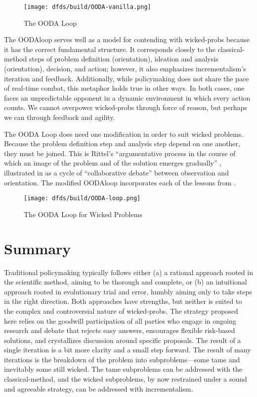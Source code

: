 \begin{figure}[h]
    \centering\CaptionFontSize
    \texttt{[image: dfds/build/OODA-vanilla.png]}
    \caption{The OODA Loop}
    \label{fig-ooda-loop}
\end{figure}

The \ac{OODAloop} serves well as a model for contending with \acp{wicked-prob} because it has the correct fundamental
structure. It corresponds closely to the \ac{classical-method} steps of problem definition (orientation), ideation and
analysis (orientation), decision, and action; however, it also emphasizes \ac{incrementalism}'s iteration and feedback.
Additionally, while policymaking does not share the pace of real-time combat, this metaphor holds true in other ways. In
both cases, one faces an unpredictable opponent in a dynamic environment in which every action counts. We cannot
overpower \acp{wicked-prob} through force of reason, but perhaps we can through feedback and agility.

The OODA Loop does need one modification in order to suit wicked problems. Because the problem definition step and
analysis step depend on one another, they must be joined. This is Rittel's ``argumentative process in the course of
which an image of the problem and of the solution emerges gradually'' \cite{rittel_dilemmas_1973}, illustrated in
 as a cycle of ``collaborative debate'' between observation and orientation. The modified
\ac{OODAloop} incorporates each of the lessons from .

\begin{figure}[h]
    \centering\CaptionFontSize
    \texttt{[image: dfds/build/OODA-loop.png]}
    \caption{The OODA Loop for Wicked Problems}
    \label{fig-policy-ooda-loop}
\end{figure}


\section{Summary}

Traditional policymaking typically follows either (a) a rational approach rooted in the scientific method, aiming to be
thorough and complete, or (b) an intuitional approach rooted in evolutionary trial and error, humbly aiming only to take
steps in the right direction. Both approaches have strengths, but neither is suited to the complex and controversial
nature of \acp{wicked-prob}. The strategy proposed here relies on the goodwill participation of all parties who engage
in ongoing research and debate that rejects easy answers, encourages flexible risk-based solutions, and crystallizes
discussion around specific proposals. The result of a single iteration is a bit more clarity and a small step forward.
The result of many iterations is the breakdown of the problem into subproblems---some tame and inevitably some still
wicked. The tame subproblems can be addressed with the \ac{classical-method}, and the wicked subproblems, by now
restrained under a sound and agreeable strategy, can be addressed with \ac{incrementalism}.

